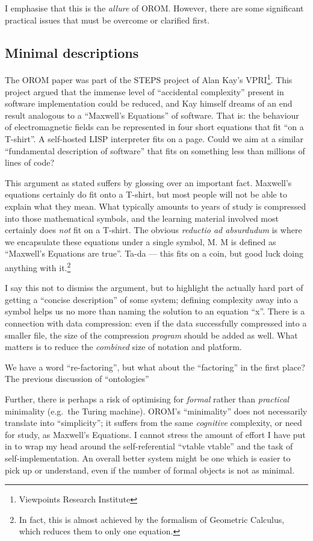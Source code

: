 I emphasise that this is the \emph{allure} of OROM. However, there are
some significant practical issues that must be overcome or clarified
first.

\hypertarget{minimal-descriptions}{%
\subsection{Minimal descriptions}\label{minimal-descriptions}}

The OROM paper was part of the STEPS project of Alan Kay's
VPRI\footnote{Viewpoints Research Institute}. This project argued that
the immense level of ``accidental complexity'' present in software
implementation could be reduced, and Kay himself dreams of an end result
analogous to a ``Maxwell's Equations'' of software. That is: the
behaviour of electromagnetic fields can be represented in four short
equations that fit ``on a T-shirt''. A self-hosted LISP interpreter fits
on a page. Could we aim at a similar ``fundamental description of
software'' that fits on something less than millions of lines of code?

This argument as stated suffers by glossing over an important fact.
Maxwell's equations certainly do fit onto a T-shirt, but most people
will not be able to explain what they mean. What typically amounts to
years of study is compressed into those mathematical symbols, and the
learning material involved most certainly does \emph{not} fit on a
T-shirt. The obvious \emph{reductio ad absurdudum} is where we
encapsulate these equations under a single symbol, M. M is defined as
``Maxwell's Equations are true''. Ta-da --- this fits on a coin, but
good luck doing anything with it.\footnote{In fact, this is almost
  achieved by the formalism of Geometric Calculus, which reduces them to
  only one equation.}

I say this not to dismiss the argument, but to highlight the actually
hard part of getting a ``concise description'' of some system; defining
complexity away into a symbol helps us no more than naming the solution
to an equation ``x''. There is a connection with data compression: even
if the data successfully compressed into a smaller file, the size of the
compression \emph{program} should be added as well. What matters is to
reduce the \emph{combined} size of notation and platform.

We have a word ``re-factoring'', but what about the ``factoring'' in the
first place? The previous discussion of ``ontologies''

Further, there is perhaps a risk of optimising for \emph{formal} rather
than \emph{practical} minimality (e.g.~the Turing machine). OROM's
``minimality'' does not necessarily translate into ``simplicity''; it
suffers from the same \emph{cognitive} complexity, or need for study, as
Maxwell's Equations. I cannot stress the amount of effort I have put in
to wrap my head around the self-referential ``vtable vtable'' and the
task of self-implementation. An overall better system might be one which
is easier to pick up or understand, even if the number of formal objects
is not as minimal.

